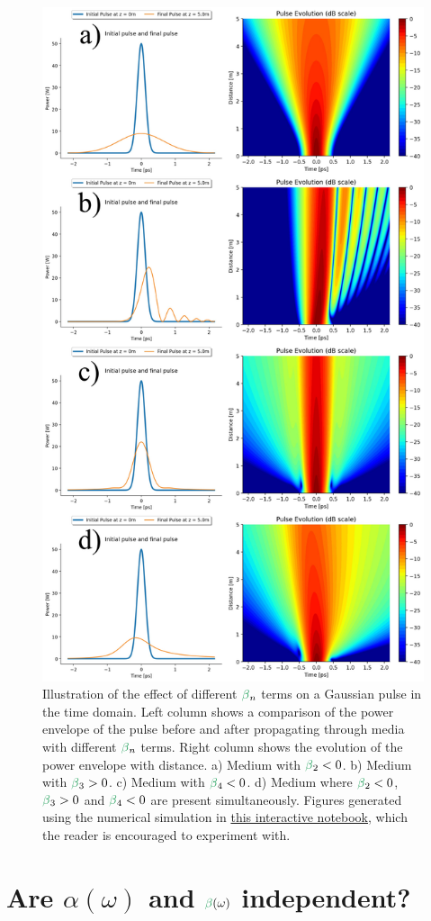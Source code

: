 \begin{figure}
    \centering
    \includegraphics[width=0.75\linewidth]{figures/dispersion_combined.png}
    \caption{Illustration of the effect of different $\betag_n$ terms on a Gaussian pulse in the time domain. Left column shows a comparison of the power envelope of the pulse before and after propagating through media with different $\betag_n$ terms. Right column shows the evolution of the power envelope with distance. a) Medium with $\betag_2<0$. b) Medium with $\betag_3>0$. c) Medium with $\betag_4<0$. d) Medium where $\betag_2<0$, $\betag_3>0$ and $\betag_4<0$ are present simultaneously. 
    Figures generated using the numerical simulation in \href{https://colab.research.google.com/drive/1PW9smFA3PECvcXyWpZcW1ogY4W3hEYFt?usp=sharing}{this interactive notebook}, which the reader is encouraged to experiment with.}
    \label{fig:dispersion_combined}
\end{figure}

\section{Are $\alpha(\omega)$ and $\betag(\omega)$ independent?}
\label{sec:KK_relations}

